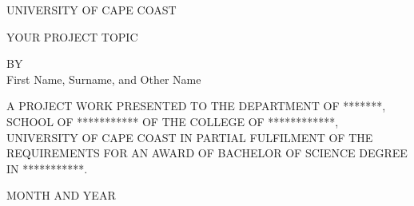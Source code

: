 \documentclass[12pt,a4paper]{report}
\begin{document}
\begin{center}

\vspace{1.0cm}
\large{UNIVERSITY OF CAPE COAST}\\
\vspace{4.0cm}

YOUR PROJECT TOPIC \\
\vspace{4.0cm}

BY\\
\vspace{0.5cm}
First Name, Surname, and Other Name\\
\vspace{3.6cm}

A PROJECT WORK PRESENTED TO THE DEPARTMENT OF *******, SCHOOL OF *********** OF THE COLLEGE OF ************, UNIVERSITY OF CAPE COAST IN PARTIAL FULFILMENT OF THE REQUIREMENTS FOR AN AWARD OF BACHELOR OF SCIENCE DEGREE IN ***********.\\
\vspace{3.5cm}

MONTH AND YEAR\\
\end{center}

\thispagestyle{empty}

\newpage



\newpage


\end{document}
